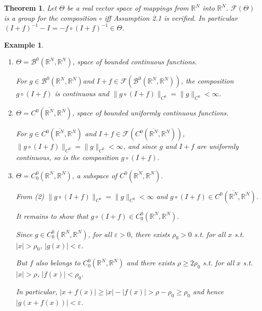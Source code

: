 \documentclass{book}
\numberwithin{equation}{section}
\newtheorem{theorem}{Theorem}[section]
\newtheorem{example}{Example}[section]
\begin{document}
\begin{enumerate}
    \begin{theorem}
        Let $\Theta$ be a real vector space of mappings from $\mathbb{R}^N$ into $\mathbb{R}^N$. $\mathcal{F}(\Theta)$ is a group for the composition $\circ$ iff Assumption 2.1 is verified. In particular $(I + f)^{-1} - I = -f\circ(I + f)^{-1}\in\Theta$.
    \end{theorem}

    \begin{example}
        \begin{enumerate}
            \item $\Theta = \mathcal{B}^0(\mathbb{R}^N,\mathbb{R}^N)$, space of bounded continuous functions.
            
            For $g\in\mathcal{B}^0(\mathbb{R}^N,\mathbb{R}^N)$and $I + f\in\mathcal{F}(\mathcal{B}^0(\mathbb{R}^N,\mathbb{R}^N))$, the composition $g\circ(I + f)$ is continuous and $\|g\circ(I + f)\|_{C^0} = \|g\|_{C^0} < \infty$.
            \item $\Theta = C^0(\overline{\mathbb{R}^N},\mathbb{R}^N)$, space of bounded uniformly continuous functions.
            
            For $g\in C^0(\overline{\mathbb{R}^N},\mathbb{R}^N)$ and $I + f\in\mathcal{F}(C^0(\overline{\mathbb{R}^N},\mathbb{R}^N))$, $\|g\circ(I + f)\|_{C^0} = \|g\|_{C^0} < \infty$, and since $g$ and $I + f$ are uniformly continuous, so is the composition $g\circ(I + f)$.
            \item $\Theta = C_0^0(\mathbb{R}^N,\mathbb{R}^N)$, a subspace of $C^0(\overline{\mathbb{R}^N},\mathbb{R}^N)$.
            
            From (2) $\|g\circ(I + f)\|_{C^0} = \|g\|_{C^0} < \infty$ and $g\circ(I + f)\in C^0(\overline{\mathbb{R}^N},\mathbb{R}^N)$.
            
            It remains to show that $g\circ(I + f)\in C_0^0(\mathbb{R}^N,\mathbb{R}^N)$.
            
            Since $g\in C_0^0(\mathbb{R}^N,\mathbb{R}^N)$, for all $\varepsilon > 0$, there exists $\rho_0 > 0$ s.t. for all $x$ s.t. $|x| > \rho_0$, $|g(x)| < \varepsilon$.
            
            But $f$ also belongs to $C_0^0(\mathbb{R}^N,\mathbb{R}^N)$ and there exists $\rho\ge 2\rho_0$ s.t. for all $x$ s.t. $|x| > \rho$, $|f(x)| < \rho_0$.
            
            In particular, $|x + f(x)|\ge|x| - |f(x)| > \rho - \rho_0\ge\rho_0$ and hence $|g(x + f(x))| < \varepsilon$.
            

\end{enumerate}
\end{example}
\end{enumerate}
\end{document}
